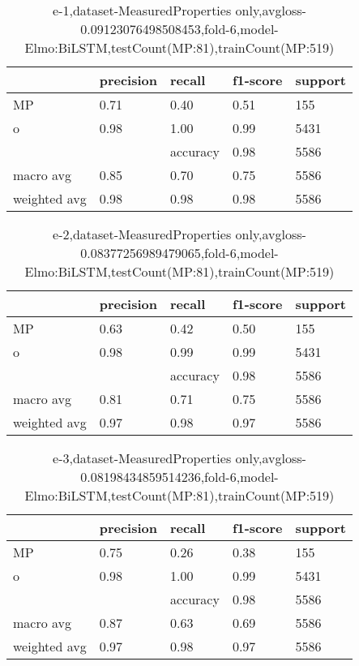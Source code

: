 \begin{table}[!ht] 
\centering
\caption{e-1,dataset-MeasuredProperties only,avgloss-0.09123076498508453,fold-6,model-Elmo:BiLSTM,testCount(MP:81),trainCount(MP:519)}\label{e-1data-mpS.tsv}
\begin{tabularx}{300pt}{|X|X|X|X|X|}
\hline
&precision&recall&f1-score&support\\
\hline
MP&0.71&0.40&0.51&155\\
\hline
o&0.98&1.00&0.99&5431\\
\hline
&&accuracy&0.98&5586\\
\hline
macro avg&0.85&0.70&0.75&5586\\
\hline
weighted avg&0.98&0.98&0.98&5586\\
\hline
\end{tabularx}
\end{table}
\begin{table}[!ht] 
\centering
\caption{e-2,dataset-MeasuredProperties only,avgloss-0.08377256989479065,fold-6,model-Elmo:BiLSTM,testCount(MP:81),trainCount(MP:519)}\label{e-2data-mpS.tsv}
\begin{tabularx}{300pt}{|X|X|X|X|X|}
\hline
&precision&recall&f1-score&support\\
\hline
MP&0.63&0.42&0.50&155\\
\hline
o&0.98&0.99&0.99&5431\\
\hline
&&accuracy&0.98&5586\\
\hline
macro avg&0.81&0.71&0.75&5586\\
\hline
weighted avg&0.97&0.98&0.97&5586\\
\hline
\end{tabularx}
\end{table}
\begin{table}[!ht] 
\centering
\caption{e-3,dataset-MeasuredProperties only,avgloss-0.08198434859514236,fold-6,model-Elmo:BiLSTM,testCount(MP:81),trainCount(MP:519)}\label{e-3data-mpS.tsv}
\begin{tabularx}{300pt}{|X|X|X|X|X|}
\hline
&precision&recall&f1-score&support\\
\hline
MP&0.75&0.26&0.38&155\\
\hline
o&0.98&1.00&0.99&5431\\
\hline
&&accuracy&0.98&5586\\
\hline
macro avg&0.87&0.63&0.69&5586\\
\hline
weighted avg&0.97&0.98&0.97&5586\\
\hline
\end{tabularx}
\end{table}
